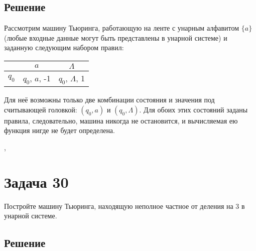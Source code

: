 \documentclass[a4paper,12pt]{article}
\begin{document}
    \subsection*{Решение}
    Рассмотрим машину Тьюринга, работающую на ленте с унарным алфавитом $\{a\}$ (любые входные данные могут быть представлены в унарной системе) и заданную следующим набором правил:
    \begin{center}
        \begin{tabular}{c||c|c}
            & {\boldmath $a$} &{\boldmath  $\Lambda$} \\
            \hline
            \hline
            {\boldmath $q_0$} & $q_0$, $a$, -1 & $q_0$, $\Lambda$, 1 \\
        \end{tabular}
    \end{center}
    Для неё возможны только две комбинации состояния и значения под считывающей головкой: $(q_0, a)$ и $(q_0, \Lambda)$. Для обоих этих состояний заданы правила, следовательно, машина никогда не остановится, и вычисляемая ею функция нигде не будет определена.
    
    \sep
    
    \section*{Задача 30}
    Постройте машину Тьюринга, находящую неполное частное от деления на $3$ в унарной системе.
    \subsection*{Решение}
    
\end{document}
